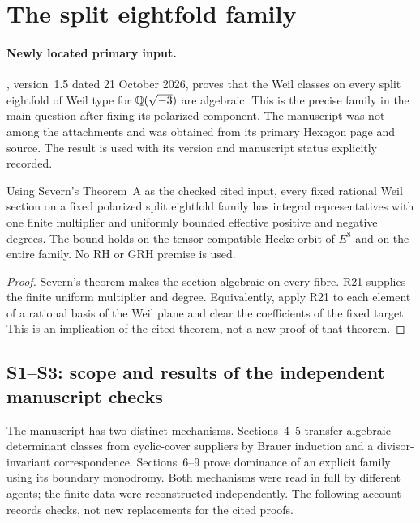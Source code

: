 

\section{The split eightfold family}\label{sec:eightfold}
\paragraph{Newly located primary input.}
\citet[Theorem~A]{Severn26}, version~1.5 dated 21 October 2026, proves that the Weil classes on every split eightfold of Weil type for $\mathbb Q(\sqrt{-3})$ are algebraic. This is the precise family in the main question after fixing its polarized component. The manuscript was not among the attachments and was obtained from its primary Hexagon page and source. The result is used with its version and manuscript status explicitly recorded.

\begin{theorem}\label{P4}
Using Severn's Theorem~A as the checked cited input, every fixed rational Weil section on a fixed polarized split eightfold family has integral representatives with one finite multiplier and uniformly bounded effective positive and negative degrees. The bound holds on the tensor-compatible Hecke orbit of $E^8$ and on the entire family. No RH or GRH premise is used.
\end{theorem}
\begin{proof}
Severn's theorem makes the section algebraic on every fibre. R21 supplies the finite uniform multiplier and degree. Equivalently, apply R21 to each element of a rational basis of the Weil plane and clear the coefficients of the fixed target. This is an implication of the cited theorem, not a new proof of that theorem.
\end{proof}

\subsection*{S1--S3: scope and results of the independent manuscript checks}
The manuscript has two distinct mechanisms. Sections~4--5 transfer algebraic determinant classes from cyclic-cover suppliers by Brauer induction and a divisor-invariant correspondence. Sections~6--9 prove dominance of an explicit family using its boundary monodromy. Both mechanisms were read in full by different agents; the finite data were reconstructed independently. The following account records checks, not new replacements for the cited proofs.

